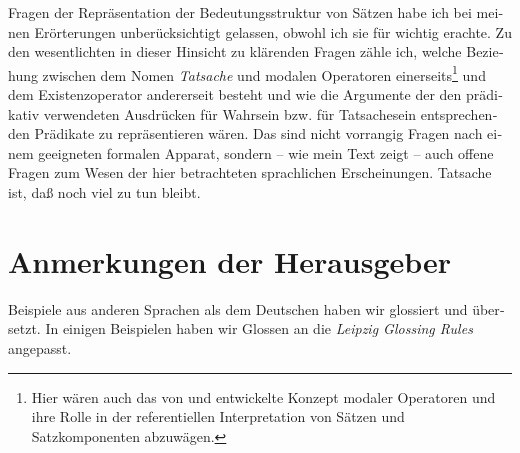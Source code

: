 \documentclass[output=paper]{langscibook}
\begin{document}
\begin{otherlanguage}{german}
Fragen der Repräsentation der Bedeutungsstruktur von Sätzen habe ich bei meinen Erörterungen unberücksichtigt gelassen, obwohl ich sie für wichtig erachte. Zu den wesentlichten in dieser Hinsicht zu klärenden Fragen zähle ich, welche Beziehung zwischen dem Nomen \textit{Tatsache} und modalen Operatoren einerseits\footnote{Hier wären auch das von \citet{jackendoff1971modal-structure-in-semantic-representation} und \citet[Kap. 7]{jackendoff1972semantic-interpretation-in-generative-grammar.} entwickelte Konzept modaler Operatoren und ihre Rolle in der referentiellen Interpretation von Sätzen und Satzkomponenten abzuwägen.} und dem Existenzoperator andererseit besteht und wie die Argumente der den prädikativ verwendeten Ausdrücken für Wahrsein bzw. für Tatsachesein entsprechenden Prädikate zu repräsentieren wären. Das sind nicht vorrangig Fragen nach einem geeigneten formalen Apparat, sondern -- wie mein Text zeigt -- auch offene Fragen zum Wesen der hier betrachteten sprachlichen Erscheinungen. Tatsache ist, daß noch viel zu tun bleibt.

\section*{Anmerkungen der Herausgeber}
Beispiele aus anderen Sprachen als dem Deutschen haben wir glossiert und übersetzt. In einigen Beispielen haben wir Glossen an die \textit{Leipzig Glossing Rules} an\-ge\-passt. 


\end{otherlanguage}
\end{document}
